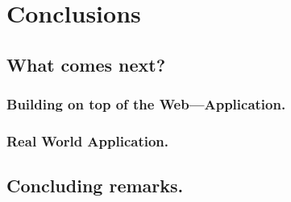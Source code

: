 \newpage

\chapter{Conclusions}

\section{What comes next?}

\subsection{Building on top of the Web---Application.}

\subsection{Real World Application.}

\section{Concluding remarks.}
